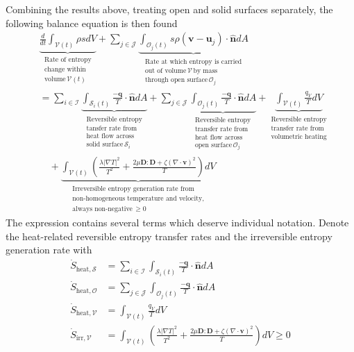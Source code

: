 Combining the results above, treating open and solid surfaces separately, the following balance equation is then found
\begin{align}
    &\underbrace{\frac{d}{dt}\int_{\mathcal{V}(t)}\rho s dV}_{\substack{\text{Rate of entropy}\\\text{change within}\\\text{volume}\,\mathcal{V}(t)}}+\sum_{j\in\mathcal{J}}\underbrace{\int_{\mathcal{O}_j(t)}s\rho(\bm{v}-\bm{u}_j)\cdot\bm{\hat{n}}dA}_{\substack{\text{Rate at which entropy is carried}\\\text{out of volume}\,\mathcal{V}\,\text{by mass}\\\text{through open surface}\,\mathcal{O}_j}}\nonumber\\
    &=\sum_{i\in\mathcal{I}}\underbrace{\int_{\mathcal{S}_i(t)}\frac{-\bm{q}}{T}\cdot\bm{\hat{n}}dA}_{\substack{\text{Reversible entropy}\\\text{tansfer rate from}\\\text{heat flow across}\\\text{solid surface}\,\mathcal{S}_i}}+\sum_{j\in\mathcal{J}}\underbrace{\int_{\mathcal{O}_j(t)}\frac{-\bm{q}}{T}\cdot\bm{\hat{n}}dA}_{\substack{\text{Reversible entropy}\\\text{transfer rate from}\\\text{heat flow across}\\\text{open surface}\,\mathcal{O}_j}}+\underbrace{\int_{\mathcal{V}(t)}\frac{q_V}{T}dV}_{\substack{\text{Reversible entropy}\\\text{transfer rate from}\\\text{volumetric heating}}}\nonumber\\
    &\quad+\underbrace{\int_{\mathcal{V}(t)}\left(\frac{\lambda|\nabla T|^2}{T^2}+\frac{2\mu\bm{D}:\bm{D}+\zeta(\nabla\cdot\bm{v})^2}{T}\right)dV}_{\substack{\text{Irreversible entropy generation rate from}\\\text{non-homogeneous temperature and velocity,}\\\text{always non-negative}\,\geq 0}}
\end{align}
The expression contains several terms which deserve individual notation. Denote the heat-related reversible entropy transfer rates and the irreversible entropy generation rate with
\begin{align}
    \dot{S}_{\text{heat},\mathcal{S}}&=\sum_{i\in\mathcal{I}}\int_{\mathcal{S}_i(t)}\frac{-\bm{q}}{T}\cdot\bm{\hat{n}}dA\\
    \dot{S}_{\text{heat},\mathcal{O}}&=\sum_{j\in\mathcal{J}}\int_{\mathcal{O}_j(t)}\frac{-\bm{q}}{T}\cdot\bm{\hat{n}}dA\\
    \dot{S}_{\text{heat},\mathcal{V}}&=\int_{\mathcal{V}(t)}\frac{q_V}{T}dV\\
    \dot{S}_{\text{irr},\mathcal{V}}&=\int_{\mathcal{V}(t)}\left(\frac{\lambda|\nabla T|^2}{T^2}+\frac{2\mu\bm{D}:\bm{D}+\zeta(\nabla\cdot\bm{v})^2}{T}\right)dV\geq 0
\end{align}
